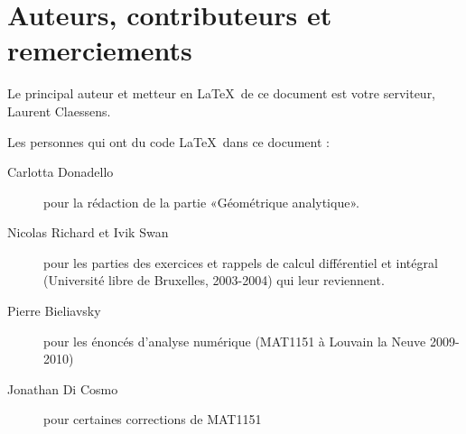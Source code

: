 \section{Auteurs, contributeurs et remerciements}

Le principal auteur et metteur en \LaTeX\ de ce document est votre serviteur, Laurent Claessens.

Les personnes qui ont du code \LaTeX\ dans ce document :
\begin{description}
    \item[Carlotta Donadello] pour la rédaction de la partie «Géométrique analytique». 
    \item[Nicolas Richard et Ivik Swan] pour les parties des exercices et rappels de calcul différentiel et intégral (Université libre de Bruxelles, 2003-2004) qui leur reviennent.
    \item[Pierre Bieliavsky] pour les énoncés d'analyse numérique (MAT1151 à Louvain la Neuve 2009-2010)
    \item[Jonathan Di Cosmo] pour certaines corrections de MAT1151
\end{description}

